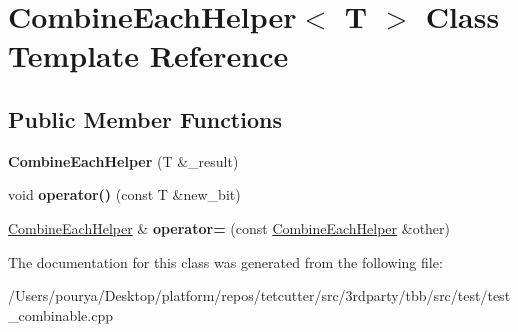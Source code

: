 \hypertarget{classCombineEachHelper}{}\section{Combine\+Each\+Helper$<$ T $>$ Class Template Reference}
\label{classCombineEachHelper}
\subsection*{Public Member Functions}
\begin{DoxyCompactItemize}
\item 
\hypertarget{classCombineEachHelper_ac65d3f1df433ed670062c3ada1dc93d9}{}{\bfseries Combine\+Each\+Helper} (T \&\+\_\+result)\label{classCombineEachHelper_ac65d3f1df433ed670062c3ada1dc93d9}

\item 
\hypertarget{classCombineEachHelper_ad69ff96401b7a8439c66171c62f0fb7e}{}void {\bfseries operator()} (const T \&new\+\_\+bit)\label{classCombineEachHelper_ad69ff96401b7a8439c66171c62f0fb7e}

\item 
\hypertarget{classCombineEachHelper_a19d66977e585780936f54ae415adf670}{}\hyperlink{classCombineEachHelper}{Combine\+Each\+Helper} \& {\bfseries operator=} (const \hyperlink{classCombineEachHelper}{Combine\+Each\+Helper} \&other)\label{classCombineEachHelper_a19d66977e585780936f54ae415adf670}

\end{DoxyCompactItemize}


The documentation for this class was generated from the following file\+:\begin{DoxyCompactItemize}
\item 
/\+Users/pourya/\+Desktop/platform/repos/tetcutter/src/3rdparty/tbb/src/test/test\+\_\+combinable.\+cpp\end{DoxyCompactItemize}
